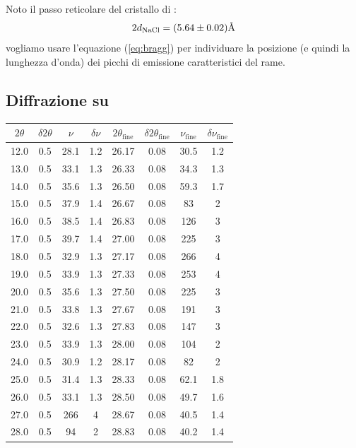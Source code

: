 
Noto il passo reticolare del cristallo di :
\begin{equation} \label{eq:DNaCl}
2d_{\ce{NaCl}} = (5.64 \pm 0.02) \unit{\angstrom}
\end{equation}
vogliamo usare l'equazione (\ref{eq:bragg}) per individuare la posizione (e quindi la lunghezza d'onda) dei picchi di emissione caratteristici del rame.

\subsection{Diffrazione su }

\begin{table}
\centering \small
\begin{tabular}{cccc|cccc}
$2\theta$ & $\delta 2\theta$ & $\nu$ & $\delta \nu$ & $2\theta_\text{fine}$ & $\delta 2\theta_\text{fine}$ & $\nu_\text{fine}$ & $\delta \nu_\text{fine}$ \\
\hline
12.0 & 0.5 & 28.1 & 1.2 & 26.17 & 0.08 & 30.5 & 1.2\\
13.0 & 0.5 & 33.1 & 1.3 & 26.33 & 0.08 & 34.3 & 1.3\\
14.0 & 0.5 & 35.6 & 1.3 & 26.50 & 0.08 & 59.3 & 1.7\\
15.0 & 0.5 & 37.9 & 1.4 & 26.67 & 0.08 & 83 & 2\\
16.0 & 0.5 & 38.5 & 1.4 & 26.83 & 0.08 & 126 & 3\\
17.0 & 0.5 & 39.7 & 1.4 & 27.00 & 0.08 & 225 & 3\\
18.0 & 0.5 & 32.9 & 1.3 & 27.17 & 0.08 & 266 & 4\\
19.0 & 0.5 & 33.9 & 1.3 & 27.33 & 0.08 & 253 & 4\\
20.0 & 0.5 & 35.6 & 1.3 & 27.50 & 0.08 & 225 & 3\\
21.0 & 0.5 & 33.8 & 1.3 & 27.67 & 0.08 & 191 & 3\\
22.0 & 0.5 & 32.6 & 1.3 & 27.83 & 0.08 & 147 & 3\\
23.0 & 0.5 & 33.9 & 1.3 & 28.00 & 0.08 & 104 & 2\\
24.0 & 0.5 & 30.9 & 1.2 & 28.17 & 0.08 & 82 & 2\\
25.0 & 0.5 & 31.4 & 1.3 & 28.33 & 0.08 & 62.1 & 1.8\\
26.0 & 0.5 & 33.1 & 1.3 & 28.50 & 0.08 & 49.7 & 1.6\\
27.0 & 0.5 & 266 & 4 & 28.67 & 0.08 & 40.5 & 1.4\\
28.0 & 0.5 & 94 & 2 & 28.83 & 0.08 & 40.2 & 1.4\\

\end{tabular}
\end{table}
